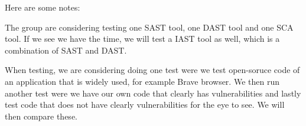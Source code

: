 Here are some notes:

The group are considering testing one SAST tool, one DAST tool and one SCA tool. 
If we see we have the time, we will test a IAST tool as well, which is a combination of SAST and DAST. 

When testing, we are considering doing one test were we test  open-soruce code of an application that is widely used, for example Brave browser. We then run another test were we have our own code that clearly has vulnerabilities and lastly test code that does not have clearly vulnerabilities for the eye to see. We will then compare these. 